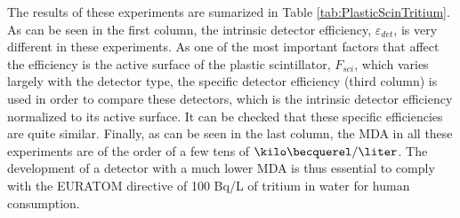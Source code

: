 The results of these experiments are sumarized in Table \ref{tab:PlasticScinTritium}. As can be seen in the first column, the intrinsic detector efficiency, $\varepsilon_{det}$, is very different in these experiments. As one of the most important factors that affect the efficiency is the active surface of the plastic scintillator, $F_{sci}$, which varies largely with the detector type, the specific detector efficiency (third column) is used in order to compare these detectors, which is the intrinsic detector efficiency normalized to its active surface. It can be checked that these specific efficiencies are quite similar. Finally, as can be seen in the last column, the MDA in all these experiments are of the order of a few tens of $\kilo\becquerel/\liter$. The development of a detector with a much lower MDA is thus essential to comply with the EURATOM directive of 100 Bq/L of tritium in water for human consumption.